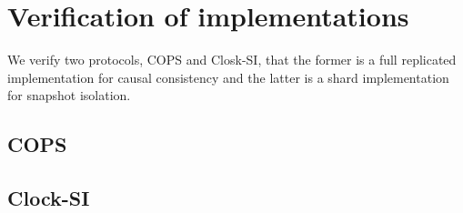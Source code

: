 \section{Verification of implementations}

We verify two protocols, COPS and Closk-SI, that the former is a full replicated implementation for causal consistency and the latter is a shard implementation for snapshot isolation.

\subsection{COPS}


\subsection{Clock-SI}


